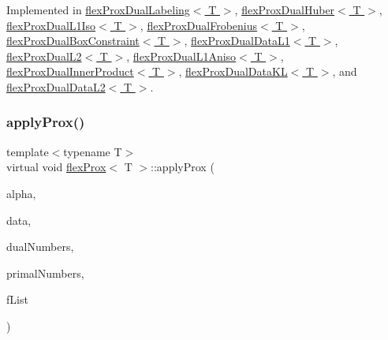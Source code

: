 Implemented in \hyperlink{classflex_prox_dual_labeling_a29e89f413ea586b9390da273141c823b}{flex\+Prox\+Dual\+Labeling$<$ T $>$}, \hyperlink{classflex_prox_dual_huber_af1e80a4361cda51e2b51aceeb69c6b79}{flex\+Prox\+Dual\+Huber$<$ T $>$}, \hyperlink{classflex_prox_dual_l1_iso_afbf9d355a5c633355233f6b7d6026465}{flex\+Prox\+Dual\+L1\+Iso$<$ T $>$}, \hyperlink{classflex_prox_dual_frobenius_a08de45a25d007ea87379641d027fd228}{flex\+Prox\+Dual\+Frobenius$<$ T $>$}, \hyperlink{classflex_prox_dual_box_constraint_a53df35f535f7df3da4e24f6190be2f7f}{flex\+Prox\+Dual\+Box\+Constraint$<$ T $>$}, \hyperlink{classflex_prox_dual_data_l1_a8ebb08fae14a70bc6ed15b6d75b67705}{flex\+Prox\+Dual\+Data\+L1$<$ T $>$}, \hyperlink{classflex_prox_dual_l2_ad4574da3855bad6596c8a3fda028c933}{flex\+Prox\+Dual\+L2$<$ T $>$}, \hyperlink{classflex_prox_dual_l1_aniso_afef01f75247ba5a8990c5b77a7ab89f0}{flex\+Prox\+Dual\+L1\+Aniso$<$ T $>$}, \hyperlink{classflex_prox_dual_inner_product_ac12298c520f5e8e81724e330e8dae6a3}{flex\+Prox\+Dual\+Inner\+Product$<$ T $>$}, \hyperlink{classflex_prox_dual_data_k_l_ad6314cbdf307759e3176e26b3efba7c6}{flex\+Prox\+Dual\+Data\+K\+L$<$ T $>$}, and \hyperlink{classflex_prox_dual_data_l2_ae3ee176dc6c05e8fba0df96c73b10464}{flex\+Prox\+Dual\+Data\+L2$<$ T $>$}.

\mbox{\label{classflex_prox_aec433ffbf1a7586f26a2116c6b94bdd6}} 
\subsubsection{\texorpdfstring{apply\+Prox()}{applyProx()}\hspace{0.1cm}{\footnotesize\ttfamily [2/2]}}
{\footnotesize\ttfamily template$<$typename T$>$ \\
virtual void \hyperlink{classflex_prox}{flex\+Prox}$<$ T $>$\+::apply\+Prox (\begin{DoxyParamCaption}\item[{T}]{alpha,  }\item[{\hyperlink{classflex_box_data}{flex\+Box\+Data}$<$ T $>$ $\ast$}]{data,  }\item[{const std\+::vector$<$ int $>$ \&}]{dual\+Numbers,  }\item[{const std\+::vector$<$ int $>$ \&}]{primal\+Numbers,  }\item[{std\+::vector$<$ Tdata $>$ \&}]{f\+List }\end{DoxyParamCaption})\hspace{0.3cm}{\ttfamily [pure virtual]}}



